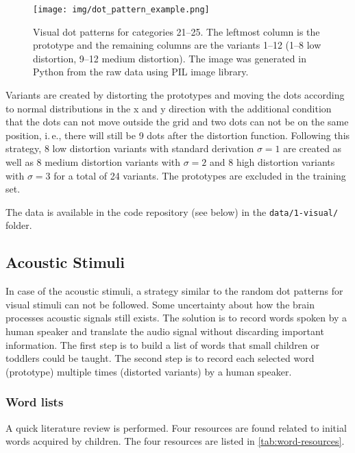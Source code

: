 \documentclass[twocolumn]{article}
\begin{document}
\begin{figure}[h]
\centering
\texttt{[image: img/dot\_pattern\_example.png]}
\caption{Visual dot patterns for categories 21--25. The leftmost column is the prototype and the remaining columns are the variants 1--12 (1--8 low distortion, 9--12 medium distortion). The image was generated in Python from the raw data using PIL image library.}
\label{fig:dot-pattern-example}
\end{figure}

Variants are created by distorting the prototypes and moving the dots according to normal distributions in the x and y direction with the additional condition that the dots can not move outside the grid and two dots can not be on the same position, i.\,e., there will still be 9 dots after the distortion function. Following this strategy, 8 low distortion variants with standard derivation $\sigma = 1$ are created as well as 8 medium distortion variants with $\sigma = 2$ and 8 high distortion variants with $\sigma = 3$ for a total of 24 variants. The prototypes are excluded in the training set.

The data is available in the code repository (see below) in the \texttt{data/1-visual/} folder.

\subsection{Acoustic Stimuli} \label{sub:acoustic-stimuli}
In case of the acoustic stimuli, a strategy similar to the random dot patterns for visual stimuli can not be followed. Some uncertainty about how the brain processes acoustic signals still exists. The solution is to record words spoken by a human speaker and translate the audio signal without discarding important information. The first step is to build a list of words that small children or toddlers could be taught. The second step is to record each selected word (prototype) multiple times (distorted variants) by a human speaker.

\subsubsection{Word lists} \label{sub:word-lists}
A quick literature review is performed. Four resources are found related to initial words acquired by children. The four resources are listed in \autoref{tab:word-resources}.
\end{document}
